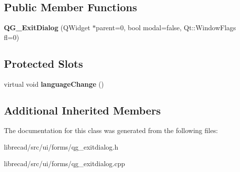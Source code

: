 \subsection*{Public Member Functions}
\begin{DoxyCompactItemize}
\item 
\hypertarget{classQG__ExitDialog_a3b018ebfd828b776faff054d8244e99e}{{\bfseries Q\-G\-\_\-\-Exit\-Dialog} (Q\-Widget $\ast$parent=0, bool modal=false, Qt\-::\-Window\-Flags fl=0)}\label{classQG__ExitDialog_a3b018ebfd828b776faff054d8244e99e}

\end{DoxyCompactItemize}
\subsection*{Protected Slots}
\begin{DoxyCompactItemize}
\item 
\hypertarget{classQG__ExitDialog_a7a2b8fa83bc2dc0e8556f6696a572433}{virtual void {\bfseries language\-Change} ()}\label{classQG__ExitDialog_a7a2b8fa83bc2dc0e8556f6696a572433}

\end{DoxyCompactItemize}
\subsection*{Additional Inherited Members}


The documentation for this class was generated from the following files\-:\begin{DoxyCompactItemize}
\item 
librecad/src/ui/forms/qg\-\_\-exitdialog.\-h\item 
librecad/src/ui/forms/qg\-\_\-exitdialog.\-cpp\end{DoxyCompactItemize}
